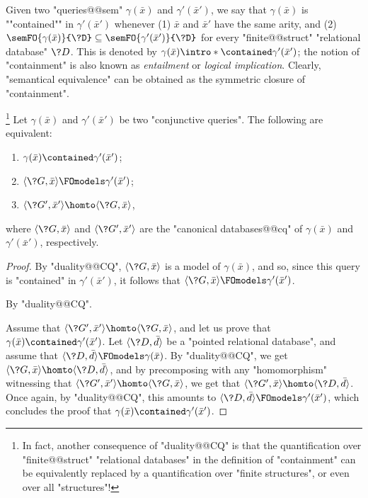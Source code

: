 Given two "queries@@sem" $\gamma(\bar x)$ and $\gamma'(\bar x')$,
we say that $\gamma(\bar x)$ is ""contained"" in $\gamma'(\bar x')$
whenever (1) $\bar x$ and $\bar x'$ have the same arity, and (2)
$\semFO{\gamma(\bar x)}{\?D} \subseteq \semFO{\gamma'(\bar x')}{\?D}$
for every "finite@@struct" "relational database" $\?D$. This is denoted by
$\gamma(\bar x) \intro*\contained \gamma'(\bar x')$; the notion
of "containment" is also known as \emph{entailment} or \emph{logical implication}.
Clearly, "semantical equivalence" can be obtained as the symmetric
closure of "containment".

\begin{proposition}
	\!\footnote{In fact, another consequence of "duality@@CQ" is that
	the quantification over "finite@@struct" "relational databases"
	in the definition of "containment" can be equivalently replaced
	by a quantification over "finite structures", or even over all "structures"!}
	\AP\label{prop:containment-hom}
	Let $\gamma(\bar x)$ and $\gamma'(\bar x')$ be two "conjunctive queries".
	The following are equivalent:
	\begin{enumerate}
		\item $\gamma(\bar x) \contained \gamma'(\bar x')$;
		\item $\tup{\?G, \bar x} \FOmodels \gamma'(\bar x')$;
		\item $\tup{\?G', \bar x'} \homto \tup{\?G, \bar x}$,
	\end{enumerate}
	where $\tup{\?G, \bar x}$ and $\tup{\?G', \bar x'}$ are the "canonical databases@@cq"
	of $\gamma(\bar x)$ and $\gamma'(\bar x')$, respectively.
\end{proposition}

\begin{proof}
	By "duality@@CQ", $\tup{\?G, \bar x}$ is a model of $\gamma(\bar x)$,
	and so, since this query is "contained" in $\gamma'(\bar x')$,
	it follows that $\tup{\?G, \bar x} \FOmodels \gamma'(\bar x')$.

	 By "duality@@CQ".

	 Assume that
	$\tup{\?G', \bar x'} \homto \tup{\?G, \bar x}$,
	and let us prove that $\gamma(\bar x) \contained \gamma'(\bar x')$.
	Let $\tup{\?D, \bar d}$ be a "pointed relational database",
	and assume that $\tup{\?D, \bar d} \FOmodels \gamma(\bar x)$.
	By "duality@@CQ", we get $\tup{\?G, \bar x} \homto \tup{\?D, \bar d}$,
	and by precomposing with any "homomorphism" witnessing
	that $\tup{\?G', \bar x'} \homto \tup{\?G, \bar x}$,
	we get that $\tup{\?G', \bar x} \homto \tup{\?D, \bar d}$.
	Once again, by "duality@@CQ", this amounts to $\tup{\?D, \bar d} \FOmodels \gamma'(\bar x')$,
	which concludes the proof that $\gamma(\bar x) \contained \gamma'(\bar x')$.
\end{proof}

